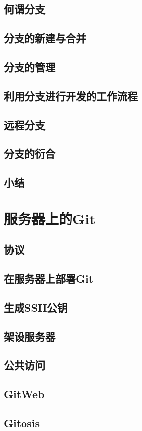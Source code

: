 \documentclass{book}
\begin{document}
	\section{何谓分支}
	\section{分支的新建与合并}
	\section{分支的管理}
	\section{利用分支进行开发的工作流程}
	\section{远程分支}
	\section{分支的衍合}
	\section{小结}

\chapter{服务器上的Git}
	\section{协议}
	\section{在服务器上部署Git}
	\section{生成SSH公钥}
	\section{架设服务器}
	\section{公共访问}
	\section{GitWeb}
	\section{Gitosis}
\end{document}
